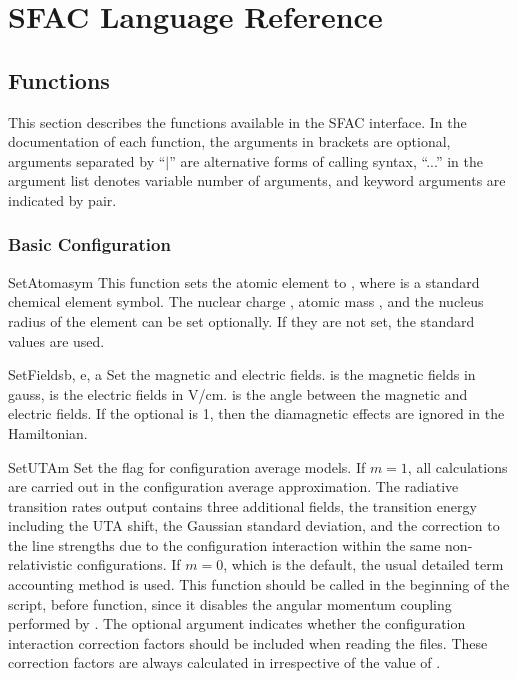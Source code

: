 \chapter{SFAC Language Reference}
\label{cha:function}

\section{Functions}
\label{sec:fac}

This section describes the functions available in the SFAC interface. In the
documentation of each function, the arguments in brackets are optional,
arguments separated by ``$\mid$'' are alternative forms of calling syntax,
``...'' in the argument list denotes variable number of arguments, and keyword
arguments are indicated by  pair.

\subsection{Basic Configuration}

\begin{fundesc}{SetAtom}{asym}
This function sets the atomic element to , where  is a
standard chemical element symbol. The nuclear charge , atomic mass
, and the nucleus radius of the element can be set optionally. If they
are not set, the standard values are used.
\end{fundesc}

\begin{fundesc}{SetFields}{b, e, a}
Set the magnetic and electric fields.  is the magnetic fields in gauss,
 is the electric fields in V/cm.  is the angle between the
magnetic and electric fields. If the optional  is 1, then the
diamagnetic effects are ignored in the Hamiltonian.
\end{fundesc}

\begin{fundesc}{SetUTA}{m}
Set the flag for configuration average models. If $m=1$, all calculations are
carried out in the configuration average approximation. The radiative transition
rates output contains three additional fields, the transition energy including
the UTA shift, the Gaussian standard deviation, and the correction to the line
strengths due to the configuration interaction within the same non-relativistic
configurations. If $m=0$, which is the default, the usual detailed term
accounting method is used. This function should be called in the beginning of
the script, before  function, since it disables the angular
momentum coupling performed by . The optional argument 
indicates whether the configuration interaction correction factors should be
included when reading the  files. These correction factors are
always calculated in  irrespective of the value of
.
\end{fundesc}

